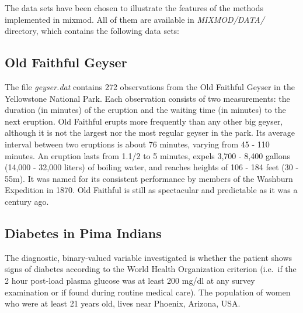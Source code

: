 The data sets have been chosen to illustrate the features of the
methods implemented in {\sc mixmod}. All of them are available in {\it
MIXMOD/DATA/} directory, which contains the following data sets:
\subsection*{Old Faithful Geyser}

The file {\it geyser.dat} contains 272 observations from the Old
Faithful Geyser in the Yellowstone National Park. Each observation
consists of two measurements: the duration (in minutes) of the eruption
and the waiting time (in minutes) to the next eruption.
Old Faithful erupts more frequently than any other big geyser,
although it is not the largest nor the most regular geyser in the park. Its
average interval between two eruptions is about 76 minutes, varying from
45 - 110 minutes. An eruption lasts from 1.1/2 to 5 minutes, expels 3,700 -
8,400 gallons (14,000 - 32,000 liters) of boiling water, and reaches
heights of 106 - 184 feet (30 - 55m). It was named for its consistent
performance by members of the Washburn Expedition in 1870. Old
Faithful is still as spectacular and predictable as it was a century
ago.

\subsection*{Diabetes in Pima Indians}
The diagnostic, binary-valued variable investigated is whether the
patient shows signs of diabetes according to the World Health Organization
criterion (i.e.\ if the 2 hour post-load plasma glucose was at least
200 mg/dl at any survey examination or if found during routine medical
care). The population of women who were at least 21 years old, lives
near Phoenix, Arizona, USA.\@

